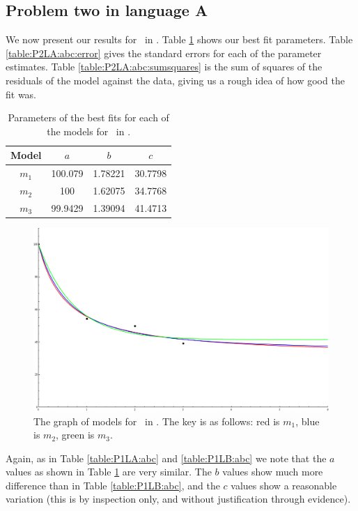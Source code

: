 \subsection{Problem two in language A} \label{subsecP2LA}

We now present our results for \PO\ in \LB.
Table \ref{table:P2LA:abc} shows our best fit parameters.
Table \ref{table:P2LA:abc:error} gives the standard errors for each of the
parameter estimates.
Table \ref{table:P2LA:abc:sumsquares} is the sum of squares of the residuals of
the model against the data, giving us a rough idea of how good the fit was.

\begin{table}[ht!]
\centering
\begin{tabular}{|c|c|c|c|}
\hline
{\bf Model} &  $a$ & $b$ & $c$ \\
\hline
$m_1$ & 100.079 & 1.78221 & 30.7798 \\
\hline
$m_2$ & 100 & 1.62075 & 34.7768\\
\hline
$m_3$ & 99.9429 & 1.39094 & 41.4713 \\
\hline
\end{tabular}
\caption{Parameters of the best fits for each of the models for \PT\ in \LA.}
\label{table:P2LA:abc}
\end{table}

\begin{figure}[ht!]
\centering
\includegraphics[scale=0.35,angle=90]{./media/P2LAGraph.png}
\caption{The graph of models for \PT\ in \LA. The key is as follows:
		 red is $m_1$,
		 blue is $m_2$,
		 green is $m_3$.
}
	\label{figure:P2LA:abc}
\end{figure}

Again, as in Table \ref{table:P1LA:abc} and \ref{table:P1LB:abc} we note that
the $a$ values as shown in Table \ref{table:P2LA:abc} are very similar.
The $b$ values show much more difference than in Table \ref{table:P1LB:abc}, and
the $c$ values show a reasonable variation (this is by inspection only, and
without justification through evidence).

